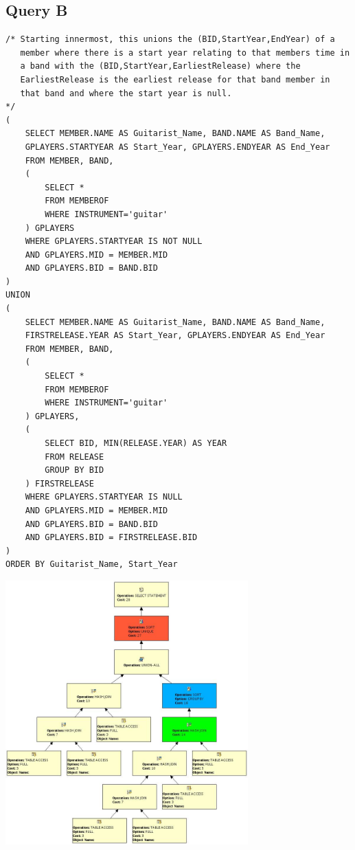 \documentclass{report}
\begin{document}
\subsection*{Query B}
\begin{verbatim}
/* Starting innermost, this unions the (BID,StartYear,EndYear) of a
   member where there is a start year relating to that members time in
   a band with the (BID,StartYear,EarliestRelease) where the
   EarliestRelease is the earliest release for that band member in
   that band and where the start year is null.
*/
(
    SELECT MEMBER.NAME AS Guitarist_Name, BAND.NAME AS Band_Name,
    GPLAYERS.STARTYEAR AS Start_Year, GPLAYERS.ENDYEAR AS End_Year
    FROM MEMBER, BAND, 
    (
        SELECT * 
        FROM MEMBEROF 
        WHERE INSTRUMENT='guitar'
    ) GPLAYERS
    WHERE GPLAYERS.STARTYEAR IS NOT NULL
    AND GPLAYERS.MID = MEMBER.MID
    AND GPLAYERS.BID = BAND.BID
) 
UNION
(
    SELECT MEMBER.NAME AS Guitarist_Name, BAND.NAME AS Band_Name,
    FIRSTRELEASE.YEAR AS Start_Year, GPLAYERS.ENDYEAR AS End_Year
    FROM MEMBER, BAND, 
    (
        SELECT * 
        FROM MEMBEROF 
        WHERE INSTRUMENT='guitar'
    ) GPLAYERS, 
    (
        SELECT BID, MIN(RELEASE.YEAR) AS YEAR
        FROM RELEASE
        GROUP BY BID
    ) FIRSTRELEASE
    WHERE GPLAYERS.STARTYEAR IS NULL
    AND GPLAYERS.MID = MEMBER.MID
    AND GPLAYERS.BID = BAND.BID
    AND GPLAYERS.BID = FIRSTRELEASE.BID
)
ORDER BY Guitarist_Name, Start_Year
\end{verbatim}
\includegraphics[width=0.7\textwidth]{Q3B}
\end{document}
